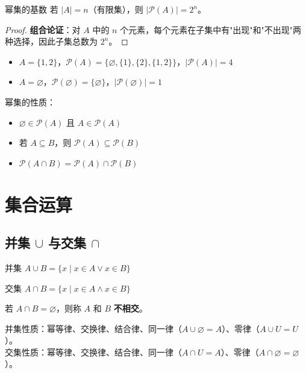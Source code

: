 \begin{myTheorem}{幂集的基数}
若 $|A| = n$（有限集），则 $|\mathcal{P}(A)| = 2^n$。
\end{myTheorem}

\begin{proof}
\textbf{组合论证}：对 $A$ 中的 $n$ 个元素，每个元素在子集中有"出现"和"不出现"两种选择，因此子集总数为 $2^n$。
\end{proof}

\begin{example}
\begin{itemize}
\item $A = \{1, 2\}$，$\mathcal{P}(A) = \{\varnothing, \{1\}, \{2\}, \{1, 2\}\}$，$|\mathcal{P}(A)| = 4$
\item $A = \varnothing$，$\mathcal{P}(\varnothing) = \{\varnothing\}$，$|\mathcal{P}(\varnothing)| = 1$
\end{itemize}
\end{example}

幂集的性质：
\begin{itemize}
\item $\varnothing \in \mathcal{P}(A)$ 且 $A \in \mathcal{P}(A)$
\item 若 $A \subseteq B$，则 $\mathcal{P}(A) \subseteq \mathcal{P}(B)$
\item $\mathcal{P}(A \cap B) = \mathcal{P}(A) \cap \mathcal{P}(B)$
\end{itemize}

\section{集合运算}

\subsection{并集 $\cup$ 与交集 $\cap$}

\begin{mydefinition}{并集}
$A \cup B = \{x \mid x \in A \lor x \in B\}$
\end{mydefinition}

\begin{mydefinition}{交集}
$A \cap B = \{x \mid x \in A \land x \in B\}$
\end{mydefinition}

若 $A \cap B = \varnothing$，则称 $A$ 和 $B$ \textbf{不相交}。

并集性质：幂等律、交换律、结合律、同一律（$A \cup \varnothing = A$）、零律（$A \cup U = U$）。\\
交集性质：幂等律、交换律、结合律、同一律（$A \cap U = A$）、零律（$A \cap \varnothing = \varnothing$）。

